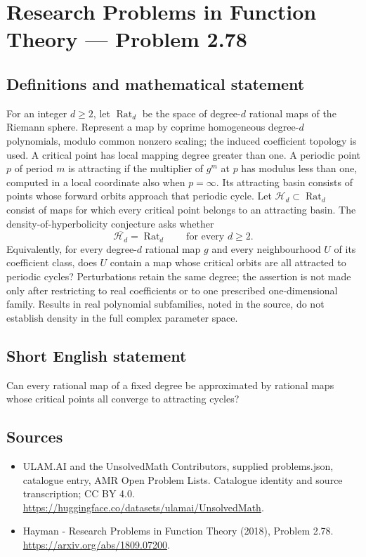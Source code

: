 \documentclass[11pt,a4paper]{article}
\begin{document}
\section*{Research Problems in Function Theory — Problem 2.78}\label{statement}

\subsection{Definitions and mathematical statement}
For an integer $d\ge2$, let $\operatorname{Rat}_d$ be the space of degree-$d$ rational maps of the Riemann sphere. Represent a map by coprime homogeneous degree-$d$ polynomials, modulo common nonzero scaling; the induced coefficient topology is used. A critical point has local mapping degree greater than one.
A periodic point $p$ of period $m$ is attracting if the multiplier of $g^m$ at $p$ has modulus less than one, computed in a local coordinate also when $p=\infty$. Its attracting basin consists of points whose forward orbits approach that periodic cycle.
Let $\mathcal H_d\subset\operatorname{Rat}_d$ consist of maps for which every critical point belongs to an attracting basin. The density-of-hyperbolicity conjecture asks whether
\[
\overline{\mathcal H_d}=\operatorname{Rat}_d
\qquad\text{for every }d\ge2.
\]
Equivalently, for every degree-$d$ rational map $g$ and every neighbourhood $U$ of its coefficient class, does $U$ contain a map whose critical orbits are all attracted to periodic cycles? Perturbations retain the same degree; the assertion is not made only after restricting to real coefficients or to one prescribed one-dimensional family. Results in real polynomial subfamilies, noted in the source, do not establish density in the full complex parameter space.
\subsection{Short English statement}
Can every rational map of a fixed degree be approximated by rational maps whose critical points all converge to attracting cycles?
\subsection{Sources}
\begin{itemize}
\item[S1] ULAM.AI and the UnsolvedMath Contributors, supplied problems.json, catalogue entry, AMR Open Problem Lists. Catalogue identity and source transcription; CC BY 4.0.
\url{https://huggingface.co/datasets/ulamai/UnsolvedMath}.
\item[S2] Hayman - Research Problems in Function Theory (2018), Problem 2.78. 
\url{https://arxiv.org/abs/1809.07200}.
\end{itemize}
\end{document}

